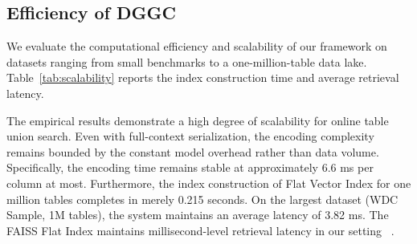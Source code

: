 \subsection{Efficiency of DGGC}
We evaluate the computational efficiency and scalability of our framework on datasets ranging from small benchmarks to a one-million-table data lake. Table~\ref{tab:scalability} reports the index construction time and average retrieval latency. %
\begin{table}[!htbp]
  \centering
  \caption{Response time of index construction and table union search}
  \label{tab:scalability}
  
\end{table}

The empirical results demonstrate a high degree of scalability for online table union search. Even with full-context serialization, the encoding complexity remains bounded by the constant model overhead rather than data volume. Specifically, the encoding time remains stable at approximately 6.6 ms per column at most. Furthermore, the index construction of {Flat Vector Index} for one million tables completes in merely 0.215 seconds. On the largest dataset (WDC Sample, 1M tables), the system maintains an average latency of {3.82 ms}. The FAISS Flat Index maintains millisecond-level retrieval latency in our setting ~\cite{johnson2019billion,aumuller2020ann}.

